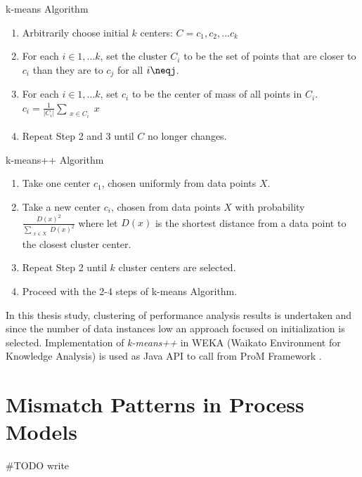 \theoremstyle{definition}
\begin{definition}{k-means Algorithm}
\begin{enumerate}
  \item Arbitrarily choose initial $k$ centers: $C={c_1,c_2,...c_k}$
  \item For each $i \in {1,...k}$, set the cluster $C_i$ to be the set of points that are closer to $c_i$ than they are to $c_j$ for all $i\neqj$.
  \item For each $i \in {1,...k}$, set $c_i$ to be the center of mass of all points in $C_i$. $c_i=\frac{1}{|C_i|} \sum_{\substack{x\in C_i}} x$
  \item Repeat Step 2 and 3 until $C$ no longer changes.
\end{enumerate}
\end{definition}

\theoremstyle{definition}
\begin{definition}{k-means++ Algorithm}
\begin{enumerate}
  \item Take one center $c_1$, chosen uniformly from data points $X$.
  \item Take a new center $c_i$, chosen from data points $X$ with probability $\frac{D(x)^2}{\sum_{\substack{x\in X}} D(x)^2}$ where let $D(x)$ is the shortest distance from a data point to the closest cluster center.
  \item Repeat Step 2 until $k$ cluster centers are selected.
  \item Proceed with the 2-4 steps of k-means Algorithm.
\end{enumerate}
\end{definition}


In this thesis study, clustering of performance analysis results is undertaken and since the number of data instances low an approach focused on initialization is selected. Implementation of \textit{k-means++} in WEKA (Waikato Environment for Knowledge
Analysis) \cite{hall2009} is used as Java API to call from ProM Framework \cite{verbeek2010prom}. 

\section{Mismatch Patterns in Process Models}
\label{sec:mismatch-patterns-in-process-models}
#TODO write
